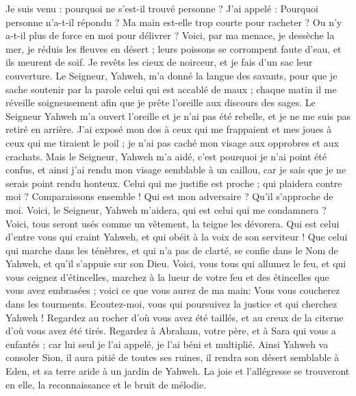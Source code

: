 \begin{multicols}{2}
Je suis venu : pourquoi ne s'est-il trouvé personne ? J'ai appelé : Pourquoi personne n'a-t-il répondu ? Ma main est-elle trop courte pour racheter ? Ou n'y a-t-il plus de force en moi pour délivrer ? Voici, par ma menace, je dessèche la mer, je réduis les fleuves en désert ; leurs poissons se corrompent faute d'eau, et ils meurent de soif.
Je revêts les cieux de noirceur, et je fais d'un sac leur couverture.
Le Seigneur, Yahweh, m'a donné la langue des savants, pour que je sache soutenir par la parole celui qui est accablé de maux ; chaque matin il me réveille soigneusement afin que je prête l'oreille aux discours des sages.
Le Seigneur Yahweh m'a ouvert l'oreille et je n'ai pas été rebelle, et je ne me suis pas retiré en arrière.
J'ai exposé mon dos à ceux qui me frappaient et mes joues à ceux qui me tiraient le poil ; je n'ai pas caché mon visage aux opprobres et aux crachats.
Mais le Seigneur, Yahweh m'a aidé, c'est pourquoi je n'ai point été confus, et ainsi j'ai rendu mon visage semblable à un caillou, car je sais que je ne serais point rendu honteux.
Celui qui me justifie est proche ; qui plaidera contre moi ? Comparaissons ensemble ! Qui est mon adversaire ? Qu'il s'approche de moi.
Voici, le Seigneur, Yahweh m'aidera, qui est celui qui me condamnera ? Voici, tous seront usés comme un vêtement, la teigne les dévorera.
Qui est celui d'entre vous qui craint Yahweh, et qui obéit à la voix de son serviteur ! Que celui qui marche dans les ténèbres, et qui n'a pas de clarté, se confie dans le Nom de Yahweh, et qu'il s'appuie sur son Dieu.
Voici, vous tous qui allumez le feu, et qui vous ceignez d'étincelles, marchez à la lueur de votre feu et des étincelles que vous avez embrasées ; voici ce que vous aurez de ma main: Vous vous coucherez dans les tourments.
\VerseOne{}Ecoutez-moi, vous qui poursuivez la justice et qui cherchez Yahweh ! Regardez au rocher d'où vous avez été taillés, et au creux de la citerne d'où vous avez été tirés.
Regardez à Abraham, votre père, et à Sara qui vous a enfantés ; car lui seul je l'ai appelé, je l'ai béni et multiplié.
Ainsi Yahweh va consoler Sion, il aura pitié de toutes ses ruines, il rendra son désert semblable à Eden, et sa terre aride à un jardin de Yahweh. La joie et l'allégresse se trouveront en elle, la reconnaissance et le bruit de mélodie.

\end{multicols}
